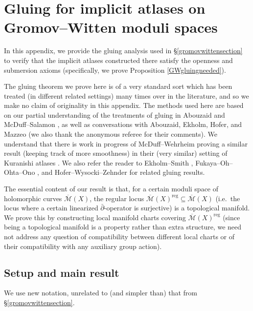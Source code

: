\documentclass[12pt]{article}
\theoremstyle{definition}
\theoremstyle{remark}
\numberwithin{equation}{subsection}
\newcommand{\Mbar}{\overline{\mathcal M}}
\newcommand{\delbar}{\bar\partial}
\newcommand{\reg}{\mathrm{reg}}
\begin{document}
\section{Gluing for implicit atlases on Gromov--Witten moduli spaces}\label{gluingappendix}

In this appendix, we provide the gluing analysis used in \S\ref{gromovwittensection} to verify that the implicit atlases constructed there satisfy the openness and submersion axioms (specifically, we prove Proposition \ref{GWgluingneeded}).

The gluing theorem we prove here is of a very standard sort which has been treated (in different related settings) many times over in the literature, and so we make no claim of originality in this appendix.  The methods used here are based on our partial understanding of the treatments of gluing in Abouzaid \cite{abouzaid} and McDuff--Salamon \cite{mcduffsalamonJholsymp}, as well as conversations with Abouzaid, Ekholm, Hofer, and Mazzeo (we also thank the anonymous referee for their comments).  We understand that there is work in progress of McDuff--Wehrheim proving a similar result (keeping track of more smoothness) in their (very similar) setting of Kuranishi atlases \cite{mcduffwehrheim,mcduffnotes}.  We also refer the reader to Ekholm--Smith \cite{ekholmsmithrevisited}, Fukaya--Oh--Ohta--Ono \cite{foootechnicaldetails}, and Hofer--Wysocki--Zehnder \cite{polyfoldGW} for related gluing results.

The essential content of our result is that, for a certain moduli space of holomorphic curves $\Mbar(X)$, the regular locus $\Mbar(X)^\reg\subseteq\Mbar(X)$ (i.e.\ the locus where a certain linearized $\delbar$-operator is surjective) is a topological manifold.  We prove this by constructing local manifold charts covering $\Mbar(X)^\reg$ (since being a topological manifold is a property rather than extra structure, we need not address any question of compatibility between different local charts or of their compatibility with any auxiliary group action).

\subsection{Setup and main result}\label{setupforgluing}

We use new notation, unrelated to (and simpler than) that from \S\ref{gromovwittensection}.
\end{document}
